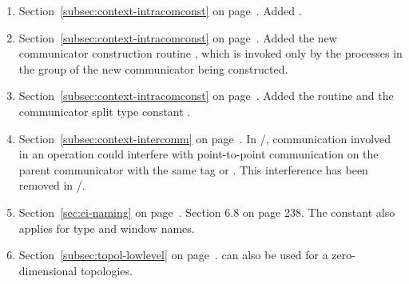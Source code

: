 \begin{enumerate}
\item 
Section~\ref{subsec:context-intracomconst} on page~\pageref{subsec:context-intracomconst}. 
\newline 
Added . 

\item 
Section~\ref{subsec:context-intracomconst} on page~\pageref{subsec:context-intracomconst}. 
\newline 
Added the new communicator construction routine , which is
invoked only by the processes in the group of the new communicator being constructed.

\item 
Section~\ref{subsec:context-intracomconst} on page~\pageref{subsec:context-intracomconst}. 
\newline 
Added the  routine
and the communicator split type constant .

\item 
Section~\ref{subsec:context-intercomm} on page~\pageref{subsec:context-intercomm}. 
\newline 
In \MPIIIDOTII/, communication involved in an   operation 
could interfere with point-to-point communication on the parent 
communicator with the same tag or .  This interference has 
been removed in \MPIIIIDOTO/.

\item 
Section~\ref{sec:ei-naming} on page~\pageref{sec:ei-naming}. 
\newline 
Section 6.8 on page 238.
The constant  also applies for type and window names. 

\item 
Section~\ref{subsec:topol-lowlevel} on page~\pageref{subsec:topol-lowlevel}. 
\newline 
{} can also be used for a zero-dimensional topologies. 


\end{enumerate}
